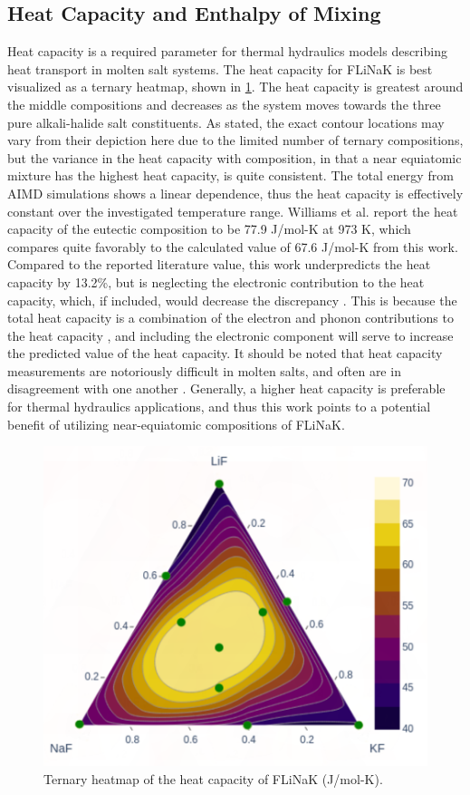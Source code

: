 \documentclass[preprint,12pt]{elsarticle}
\providecommand{\DIFadd}[1]{{\protect\color{blue} \sf #1}} %
\providecommand{\DIFaddbegin}{} %
\providecommand{\DIFaddend}{} %
\newcommand{\DIFaddincludegraphics}[2][]{{\color{blue}\fbox{\DIFOincludegraphics[#1]{#2}}}} %
\DeclareRobustCommand{\DIFaddbegin}{\DIFOaddbegin \let\includegraphics\DIFaddincludegraphics} %
\DeclareRobustCommand{\DIFaddend}{\DIFOaddend \let\includegraphics\DIFOincludegraphics} %
\begin{document}
\subsection{Heat Capacity and Enthalpy of Mixing}

Heat capacity is a required parameter for thermal hydraulics models describing heat transport in molten salt systems\cite{freile2019}. The heat capacity for FLiNaK is best visualized as a ternary heatmap, shown in \cref{fig:Cp}. The heat capacity is greatest around the middle compositions and decreases as the system moves towards the three pure alkali-halide salt constituents. As stated, the exact contour locations may vary from their depiction here due to the limited number of ternary compositions, but the variance in the heat capacity with composition, in that a near equiatomic mixture has the highest heat capacity, is quite consistent. The total energy from AIMD simulations shows a linear dependence, thus the heat capacity is effectively constant over the investigated temperature range. Williams et al. report the heat capacity of the eutectic composition to be 77.9 J/mol-K at 973 K\cite{williams2006Cp}, which compares quite favorably to the calculated value of 67.6 J/mol-K from this work. Compared to the reported literature value, this work underpredicts the heat capacity by 13.2\%, but is neglecting the electronic contribution to the heat capacity, which, if included, would decrease the discrepancy\DIFaddbegin \DIFadd{. This is because the total heat capacity is a combination of the electron and phonon contributions to the heat capacity \cite{moore_uzr}, and including the electronic component will serve to increase the predicted value of the heat capacity}\DIFaddend . It should be noted that heat capacity measurements are notoriously difficult in molten salts, and often are in disagreement with one another \cite{robertson2022}. Generally, a higher heat capacity is preferable for thermal hydraulics applications, and thus this work points to a potential benefit of utilizing near-equiatomic compositions of FLiNaK. 

\begin{figure}[!ht]
    \centering
    \includegraphics[width=.7\textwidth]{heatCapacity_withScatter.png}
    \caption{Ternary heatmap of the heat capacity of FLiNaK (J/mol-K).}
    \label{fig:Cp}
\end{figure}
\end{document}
